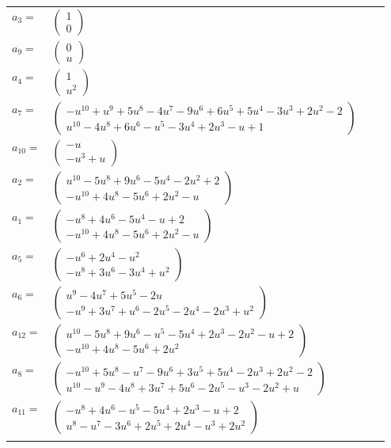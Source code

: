 \documentclass[1p]{elsarticle_modified}
\theoremstyle{definition}
\begin{document}
\begin{tabular}{m{7pt} m{180pt} m{7pt} m{180pt} }
\flushright $a_{3}=$&$\begin{pmatrix}1\\0\end{pmatrix}$ \\
\flushright $a_{9}=$&$\begin{pmatrix}0\\u\end{pmatrix}$ \\
\flushright $a_{4}=$&$\begin{pmatrix}1\\u^2\end{pmatrix}$ \\
\flushright $a_{7}=$&$\begin{pmatrix}- u^{10}+u^9+5 u^8-4 u^7-9 u^6+6 u^5+5 u^4-3 u^3+2 u^2-2\\u^{10}-4 u^8+6 u^6- u^5-3 u^4+2 u^3- u+1\end{pmatrix}$ \\
\flushright $a_{10}=$&$\begin{pmatrix}- u\\- u^3+u\end{pmatrix}$ \\
\flushright $a_{2}=$&$\begin{pmatrix}u^{10}-5 u^8+9 u^6-5 u^4-2 u^2+2\\- u^{10}+4 u^8-5 u^6+2 u^2- u\end{pmatrix}$ \\
\flushright $a_{1}=$&$\begin{pmatrix}- u^8+4 u^6-5 u^4- u+2\\- u^{10}+4 u^8-5 u^6+2 u^2- u\end{pmatrix}$ \\
\flushright $a_{5}=$&$\begin{pmatrix}- u^6+2 u^4- u^2\\- u^8+3 u^6-3 u^4+u^2\end{pmatrix}$ \\
\flushright $a_{6}=$&$\begin{pmatrix}u^9-4 u^7+5 u^5-2 u\\- u^9+3 u^7+u^6-2 u^5-2 u^4-2 u^3+u^2\end{pmatrix}$ \\
\flushright $a_{12}=$&$\begin{pmatrix}u^{10}-5 u^8+9 u^6- u^5-5 u^4+2 u^3-2 u^2- u+2\\- u^{10}+4 u^8-5 u^6+2 u^2\end{pmatrix}$ \\
\flushright $a_{8}=$&$\begin{pmatrix}- u^{10}+5 u^8- u^7-9 u^6+3 u^5+5 u^4-2 u^3+2 u^2-2\\u^{10}- u^9-4 u^8+3 u^7+5 u^6-2 u^5- u^3-2 u^2+u\end{pmatrix}$ \\
\flushright $a_{11}=$&$\begin{pmatrix}- u^8+4 u^6- u^5-5 u^4+2 u^3- u+2\\u^8- u^7-3 u^6+2 u^5+2 u^4- u^3+2 u^2\end{pmatrix}$\\&\end{tabular}
\end{document}
